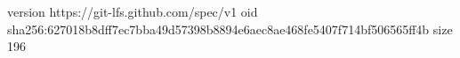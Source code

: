 version https://git-lfs.github.com/spec/v1
oid sha256:627018b8dff7ec7bba49d57398b8894e6aec8ae468fe5407f714bf506565ff4b
size 196
